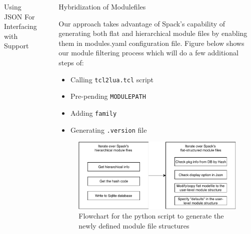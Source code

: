 \documentclass[final]{beamer}
\newlength{\sepwid}
\newlength{\onecolwid}
\begin{document}
\begin{frame}[t]
\begin{columns}[t]
\begin{column}{\onecolwid}
\begin{block}{Using JSON For Interfacing with Support}
\end{block}

\end{column} %


\begin{column}{\sepwid}\end{column} %

\begin{column}{\onecolwid} %


\begin{block}{Hybridization of Modulefiles}

Our approach takes advantage of Spack's capability of generating both flat and hierarchical module files by enabling them in modules.yaml configuration file. Figure below shows our module filtering process which will do a few additional steps of:

\setlength{\leftmargini}{9.5cm}
\setlength{\leftmarginii}{9.5cm}
\begin{itemize}
    \item Calling \texttt{tcl2lua.tcl} script
    \item Pre-pending \texttt{MODULEPATH} 
    \item Adding \texttt{family} 
    \item Generating \texttt{.version} file
\end{itemize}

\vspace{0.75em}
\begin{figure}
  \centerline{\includegraphics[width=0.8\linewidth]{figures/modulefilter_flowchart}}
  \caption{Flowchart for the python script to generate the newly defined module file structures}
\end{figure}


\end{block}
\end{column}
\end{columns}
\end{frame}
\end{document}
